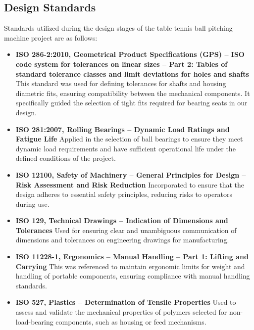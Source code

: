 \documentclass[12pt]{report}
\begin{document}
\subsection{Design Standards}
Standards utilized during the design stages of the table tennis ball pitching machine project are as follows:
\begin{itemize}
    \item \textbf{ISO 286-2:2010, Geometrical Product Specifications (GPS) – ISO code system for tolerances on linear sizes – Part 2: Tables of standard tolerance classes and limit deviations for holes and shafts}\cite{ISO286-2:2010}
    This standard was used for defining tolerances for shafts and housing diametric fits, ensuring compatibility between the mechanical components. It specifically guided the selection of tight fits required for bearing seats in our design.
    
    \item \textbf{ISO 281:2007, Rolling Bearings – Dynamic Load Ratings and Fatigue Life}\cite{ISO281:2007}
    Applied in the selection of ball bearings to ensure they meet dynamic load requirements and have sufficient operational life under the defined conditions of the project.
    
    \item \textbf{ISO 12100, Safety of Machinery – General Principles for Design – Risk Assessment and Risk Reduction}\cite{ISO12100:2010}
    Incorporated to ensure that the design adheres to essential safety principles, reducing risks to operators during use.
    
    \item \textbf{ISO 129, Technical Drawings – Indication of Dimensions and Tolerances}\cite{ISO129-1:2018}
    Used for ensuring clear and unambiguous communication of dimensions and tolerances on engineering drawings for manufacturing.
    
    \item \textbf{ISO 11228-1, Ergonomics – Manual Handling – Part 1: Lifting and Carrying}\cite{ISO11228-1:2003}
    This was referenced to maintain ergonomic limits for weight and handling of portable components, ensuring compliance with manual handling standards.
    
    \item \textbf{ISO 527, Plastics – Determination of Tensile Properties}\cite{ISO527:2019}
    Used to assess and validate the mechanical properties of polymers selected for non-load-bearing components, such as housing or feed mechanisms.
    

\end{itemize}
\end{document}
